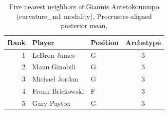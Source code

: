 \begin{table}[htbp]
  \centering\small
  \begin{tabular}{rllc}
    \toprule
    Rank & Player & Position & Archetype \\
    \midrule
    1 & LeBron James & G & 3 \\
    2 & Manu Ginobili & G & 3 \\
    3 & Michael Jordan & G & 3 \\
    4 & Frank Brickowski & F & 3 \\
    5 & Gary Payton & G & 3 \\
    \bottomrule
  \end{tabular}
  \caption{Five nearest neighbors of Giannis Antetokounmpo (curvature_m1 modality), Procrustes-aligned posterior mean.}
  \label{tab:Giannis_Antetokounmpo_neighbors_curvature_m1}
\end{table}


